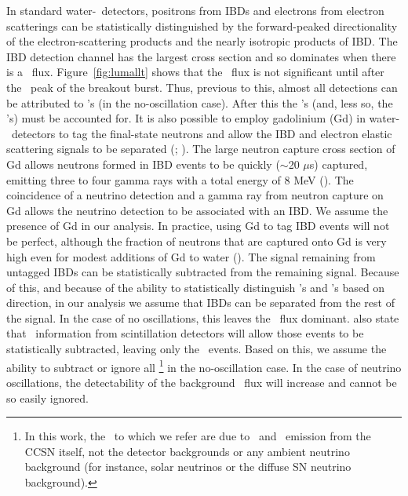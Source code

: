 In standard water-\cer\ detectors, positrons from
IBDs and electrons from 
electron scatterings can be statistically distinguished by the
forward-peaked directionality of the electron-scattering products and the
nearly isotropic products of IBD.
 The IBD
detection channel has the largest cross section and so 
dominates when there is a \anue\ flux.  Figure~\ref{fig:lumallt} shows
that the \anue\ flux is not significant until after the
\nue\ peak of the breakout burst.
Thus, previous to this, almost all detections can be attributed
to \nue's (in the no-oscillation case).
After this the \anue's (and, less so, the \nux's) 
must be accounted
for.  It is also possible to 
employ gadolinium (Gd) in water-\cer\ detectors 
to tag the final-state neutrons and allow the IBD and
electron elastic scattering signals to be separated
(\citealt{vagins2012}; \citealt{lahabeacom2014}).  The large neutron
capture cross section of Gd allows neutrons formed in IBD events to be
quickly ($\sim$20 $\mu$s) captured, emitting three to four gamma rays with a total
energy of 8 MeV (\citealt{beacomvagins2004}).  
The coincidence of a neutrino
detection and a gamma ray from neutron capture on Gd 
allows the neutrino detection to be associated with an IBD.  We
assume the presence of Gd in our analysis.  In practice, using Gd to
tag IBD events will not be perfect, although the fraction of neutrons
that are captured onto Gd is very high even for modest additions of Gd
to water (\citealt{beacomvagins2004}).  The signal remaining from
untagged IBDs can be statistically subtracted from the remaining signal.
Because of this, and because of the ability to statistically distinguish
\nue's and \anue's based on direction, in our analysis we assume that
IBDs can be separated from the rest of the signal.  In the case of no
oscillations, this leaves the \nue\ flux dominant.
\cite{lahabeacom2014} also state that \nux\ 
information from scintillation detectors 
will allow those events to be statistically subtracted,
leaving only the \nue\ events.  Based on this, we assume the
ability to subtract or ignore all \backgrounds\footnote{In this work,
the \backgrounds\ to which we refer are due to \anue\ and \nux\
emission from the CCSN itself, not the detector backgrounds or any
ambient neutrino background (for instance, solar neutrinos or the
diffuse SN neutrino background).} in the no-oscillation
case.  In the case of neutrino oscillations, the detectability of the 
background \nux\ flux
will increase and cannot be so easily ignored.

